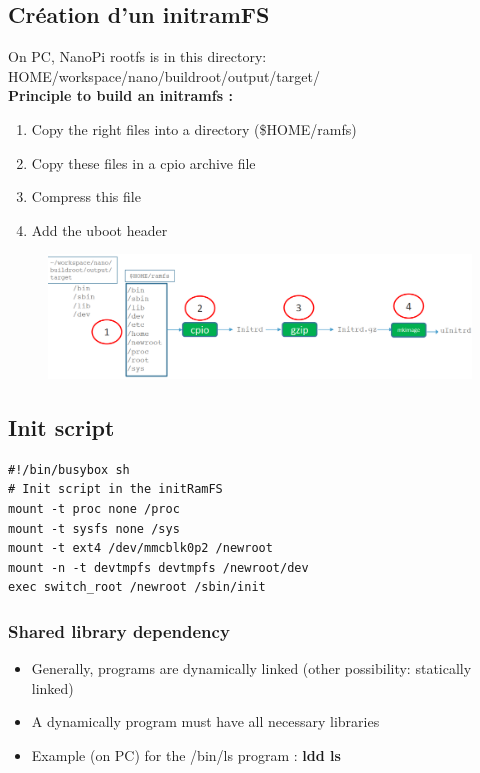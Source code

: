 \documentclass[resume]{subfiles}
\begin{document}
\subsection{Création d'un initramFS}
On PC, NanoPi rootfs is in this directory: HOME/workspace/nano/buildroot/output/target/\\
\textbf{Principle to build an initramfs :}
\begin{enumerate}
\item Copy the right files into a directory (\$HOME/ramfs)
\item Copy these files in a cpio archive file
\item Compress this file
\item Add the uboot header
\end{enumerate}

\begin{figure}[H]
    \centering
    \includegraphics[width=1\columnwidth]{Figures/fileSystem/builtInitRamFs.png}
    \label{fig:builtInitRamsFs}
\end{figure}

\subsection{Init script}
\begin{lstlisting}[style=console,label={},caption={}]
#!/bin/busybox sh
# Init script in the initRamFS
mount -t proc none /proc
mount -t sysfs none /sys
mount -t ext4 /dev/mmcblk0p2 /newroot
mount -n -t devtmpfs devtmpfs /newroot/dev
exec switch_root /newroot /sbin/init
\end{lstlisting}

\subsubsection{Shared library dependency}
\begin{itemize}
\item Generally, programs are dynamically linked (other possibility: statically linked)
\item A dynamically program must have all necessary libraries
\item Example (on PC) for the /bin/ls program : \textbf{ldd ls}
\end{itemize}
\end{document}
